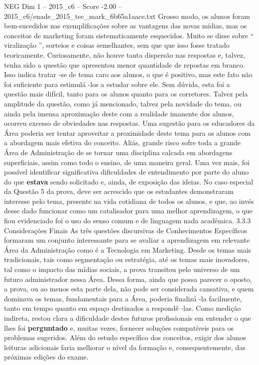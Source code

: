 \begin{textsample}{NEG Dim 1 – 2015\_c6 – Score -2.00 – 2015\_c6/enade\_2015\_tec\_mark\_6b65a1aace.txt}
Grosso modo, os alunos foram bem-sucedidos nas exemplificações sobre as vantagens das novas mídias, mas os conceitos de marketing foram sistematicamente esquecidos.
Muito se disse sobre “ viralização ”, sorteios e coisas semelhantes, sem que que isso fosse tratado teoricamente.
Curiosamente, não houve tanta dispersão nas respostas e, talvez, tenha sido a questão que apresentou menor quantidade de repostas em branco.
Isso indica tratar -se de tema caro aos alunos, o que é positivo, mas este fato não foi suficiente para estimulá -los a estudar sobre ele.
Sem dúvida, esta foi a questão mais difícil, tanto para os alunos quanto para os corretores.
Talvez pela amplitude da questão, como já mencionado, talvez pela novidade do tema, ou ainda pela imensa aproximação deste com a realidade imanente dos alunos, ocorreu excesso de obviedades nas respostas.
Uma sugestão para os educadores da Área poderia ser tentar aproveitar a proximidade deste tema para os alunos com a abordagem mais efetiva do conceito.
Aliás, grande risco sofre toda a grande Área de Administração de se tornar uma disciplina calcada em abordagens superficiais, assim como todo o ensino, de uma maneira geral.
Uma vez mais, foi possível identificar significativa dificuldades de entendimento por parte do aluno do que \textbf{estava} sendo solicitado e, ainda, de exposição das ideias.
No caso especial da Questão 5 da prova, deve ser acrescido que os estudantes demonstraram interesse pelo tema, presente na vida cotidiana de todos os alunos, e que, ao invés desse dado funcionar como um catalisador para uma melhor aprendizagem, o que fiou evidenciado foi o uso do senso comum e de linguagem nada acadêmica. 3.3.3 Considerações Finais As três questões discursivas de Conhecimentos Específicos formaram um conjunto interessante para se avaliar a aprendizagem em relevante Área da Administração como é a Tecnologia em Marketing.
Desde os temas mais tradicionais, tais como segmentação ou estratégia, até os temas mais inovadores, tal como o impacto das mídias sociais, a prova transitou pelo universo de um futuro administrador nessa Área.
Dessa forma, ainda que possa parecer o oposto, a prova, ou ao menos esta parte dela, não pode ser considerada cansativa, e quem dominava os temas, fundamentais para a Área, poderia finalizá -la facilmente, tanto em tempo quanto em espaço destinados a respondê -las.
Como medição indireta, restou clara a dificuldade destes futuros profissionais em entender o que lhes foi \textbf{perguntado} e, muitas vezes, fornecer soluções compatíveis para os problemas sugeridos.
Além do estudo específico dos conceitos, exigir dos alunos leituras adicionais faria melhorar o nível da formação e, consequentemente, das próximas edições do exame.

\end{textsample}
